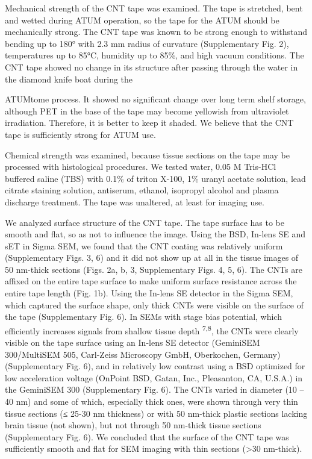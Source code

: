 \documentclass{article}
\begin{document}
Mechanical strength of the CNT tape was examined. The tape is stretched, bent and wetted during ATUM operation, so the tape for the ATUM should be mechanically strong. The CNT tape was known to be strong enough to withstand bending up to 180° with 2.3 mm radius of curvature (Supplementary Fig. 2), temperatures up to 85°C, humidity up to 85\%, and high vacuum conditions. The CNT tape showed no change in its structure after passing through the water in the diamond knife boat during the

ATUMtome process. It showed no significant change over long term shelf storage, although PET in the base of the tape may become yellowish from ultraviolet irradiation. Therefore, it is better to keep it shaded. We believe that the CNT tape is sufficiently strong for ATUM use.

Chemical strength was examined, because tissue sections on the tape may be processed with histological procedures. We tested water, 0.05 M Tris-HCl buffered saline (TBS) with 0.1\% of triton X-100, 1\% uranyl acetate solution, lead citrate staining solution, antiserum, ethanol, isopropyl alcohol and plasma discharge treatment. The tape was unaltered, at least for imaging use.

We analyzed surface structure of the CNT tape. The tape surface has to be smooth and flat, so as not to influence the image. Using the BSD, In-lens SE and sET in Sigma SEM, we found that the CNT coating was relatively uniform (Supplementary Figs. 3, 6) and it did not show up at all in the tissue images of 50 nm-thick sections (Figs. 2a, b, 3, Supplementary Figs. 4, 5, 6).  The CNTs are affixed on the entire tape surface to make uniform surface resistance across the entire tape length (Fig. 1b). Using the In-lens SE detector in the Sigma SEM, which captured the surface shape, only thick CNTs were visible on the surface of the tape (Supplementary Fig. 6). In SEMs with stage bias potential, which efficiently increases signals from shallow tissue depth \textsuperscript{7,8}, the CNTs were clearly visible on the tape surface using an In-lens SE detector (GeminiSEM 300/MultiSEM 505, Carl-Zeiss Microscopy GmbH, Oberkochen, Germany) (Supplementary Fig. 6), and in relatively low contrast using a BSD optimized for low acceleration voltage (OnPoint BSD, Gatan, Inc., Pleasanton, CA, U.S.A.) in the GeminiSEM 300 (Supplementary Fig. 6). The CNTs varied in diameter (10 – 40 nm) and some of which, especially thick ones, were shown through very thin tissue sections (≤ 25-30 nm thickness) or with 50 nm-thick plastic sections lacking brain tissue (not shown), but not through 50 nm-thick tissue sections (Supplementary Fig. 6). We concluded that the surface of the CNT tape was sufficiently smooth and flat for SEM imaging with thin sections (>30 nm-thick).
\end{document}

